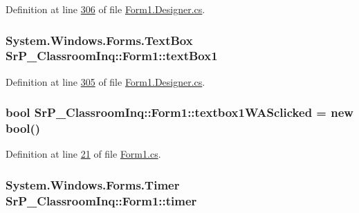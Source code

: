 \-Definition at line \hyperlink{_form1_8_designer_8cs_source_l00306}{306} of file \hyperlink{_form1_8_designer_8cs_source}{\-Form1.\-Designer.\-cs}.

\hypertarget{class_sr_p___classroom_inq_1_1_form1_a5e6a7c23f32069d88989c05f205fcf12}{
\subsubsection[{text\-Box1}]{\setlength{\rightskip}{0pt plus 5cm}\-System.\-Windows.\-Forms.\-Text\-Box {\bf \-Sr\-P\-\_\-\-Classroom\-Inq\-::\-Form1\-::text\-Box1}}}
\label{class_sr_p___classroom_inq_1_1_form1_a5e6a7c23f32069d88989c05f205fcf12}


\-Definition at line \hyperlink{_form1_8_designer_8cs_source_l00305}{305} of file \hyperlink{_form1_8_designer_8cs_source}{\-Form1.\-Designer.\-cs}.

\hypertarget{class_sr_p___classroom_inq_1_1_form1_abd63ca218d550d28baff3071b1c27483}{
\subsubsection[{textbox1\-W\-A\-Sclicked}]{\setlength{\rightskip}{0pt plus 5cm}bool {\bf \-Sr\-P\-\_\-\-Classroom\-Inq\-::\-Form1\-::textbox1\-W\-A\-Sclicked} = new bool()}}
\label{class_sr_p___classroom_inq_1_1_form1_abd63ca218d550d28baff3071b1c27483}


\-Definition at line \hyperlink{_form1_8cs_source_l00021}{21} of file \hyperlink{_form1_8cs_source}{\-Form1.\-cs}.

\hypertarget{class_sr_p___classroom_inq_1_1_form1_adacccc843b86b09e50b25ce543142eff}{
\subsubsection[{timer}]{\setlength{\rightskip}{0pt plus 5cm}\-System.\-Windows.\-Forms.\-Timer {\bf \-Sr\-P\-\_\-\-Classroom\-Inq\-::\-Form1\-::timer}}}
\label{class_sr_p___classroom_inq_1_1_form1_adacccc843b86b09e50b25ce543142eff}


